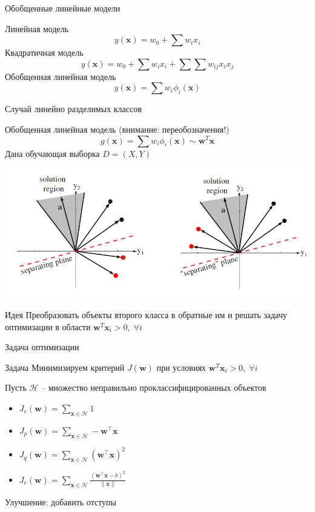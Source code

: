 \documentclass[aspectratio=169]{beamer}
\begin{document}
\begin{frame}{Обобщенные линейные модели}

Линейная модель
\[
y(\mathbf{x}) = w_0 + \sum w_i x_i
\]
Квадратичная модель
\[
y(\mathbf{x}) = w_0 + \sum w_i x_i + \sum \sum w_{ij} x_i x_j
\]
Обобщенная линейная модель
\[
y(\mathbf{x}) = \sum w_i \phi_i(\mathbf{x})
\]

\end{frame}

\begin{frame}{Случай линейно разделимых классов}

Обобщенная линейная модель (внимание: переобозначения!)
\[
g(\mathbf{x}) = \sum w_i \phi_i(\mathbf{x}) \sim \mathbf{w}^T \mathbf{x}
\]
Дана обучающая выборка $D = (X, Y)$

\begin{center}
\includegraphics[scale=0.35]{images/optimzation.png}
\end{center}

\begin{exampleblock}{Идея}
Преобразовать объекты второго класса в обратные им и решать задачу оптимизации в области $\mathbf{w}^T \mathbf{x}_i > 0, \; \forall i$
\end{exampleblock}

\end{frame}

\begin{frame}{Задача оптимизации}

\begin{block}{Задача}
Минимизируем критерий $J(\mathbf{w})$ при условиях $\mathbf{w}^T \mathbf{x}_i > 0, \; \forall i$
\end{block}

Пусть $\mathcal{H}$ -- множество неправильно проклассифицированных объектов
\begin{itemize}
\item $J_e(\mathbf{w}) = \sum_{\mathbf{x} \in \mathcal{H}} 1$ 
\item $J_p(\mathbf{w}) = \sum_{\mathbf{x} \in \mathcal{H}} - \mathbf{w}^\top \mathbf{x}$ 
\item $J_q(\mathbf{w}) = \sum_{\mathbf{x} \in \mathcal{H}} (\mathbf{w}^\top \mathbf{x})^2$
\item $J_r(\mathbf{w}) = \sum_{\mathbf{x} \in \mathcal{H}} \frac{(\mathbf{w}^\top \mathbf{x} - b)^2}{\|\mathbf{x}\|}$
\end{itemize}
Улучшение: добавить отступы

\end{frame}
\end{document}
